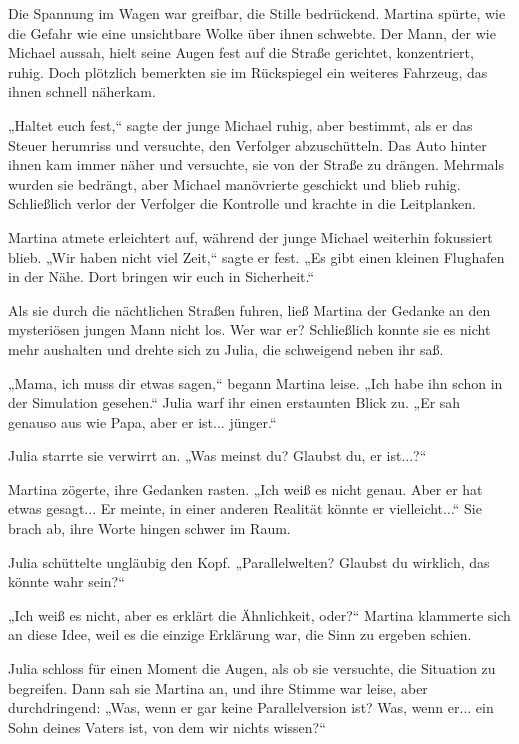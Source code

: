 \documentclass[
]{article}
\begin{document}
Die Spannung im Wagen war greifbar, die Stille bedrückend. Martina
spürte, wie die Gefahr wie eine unsichtbare Wolke über ihnen schwebte.
Der Mann, der wie Michael aussah, hielt seine Augen fest auf die Straße
gerichtet, konzentriert, ruhig. Doch plötzlich bemerkten sie im
Rückspiegel ein weiteres Fahrzeug, das ihnen schnell näherkam.

„Haltet euch fest,`` sagte der junge Michael ruhig, aber bestimmt, als
er das Steuer herumriss und versuchte, den Verfolger abzuschütteln. Das
Auto hinter ihnen kam immer näher und versuchte, sie von der Straße zu
drängen. Mehrmals wurden sie bedrängt, aber Michael manövrierte
geschickt und blieb ruhig. Schließlich verlor der Verfolger die
Kontrolle und krachte in die Leitplanken.

Martina atmete erleichtert auf, während der junge Michael weiterhin
fokussiert blieb. „Wir haben nicht viel Zeit,`` sagte er fest. „Es gibt
einen kleinen Flughafen in der Nähe. Dort bringen wir euch in
Sicherheit.``

Als sie durch die nächtlichen Straßen fuhren, ließ Martina der Gedanke
an den mysteriösen jungen Mann nicht los. Wer war er? Schließlich konnte
sie es nicht mehr aushalten und drehte sich zu Julia, die schweigend
neben ihr saß.

„Mama, ich muss dir etwas sagen,`` begann Martina leise. „Ich habe ihn
schon in der Simulation gesehen.`` Julia warf ihr einen erstaunten Blick
zu. „Er sah genauso aus wie Papa, aber er ist... jünger.``

Julia starrte sie verwirrt an. „Was meinst du? Glaubst du, er
ist...?{\kern0pt}``

Martina zögerte, ihre Gedanken rasten. „Ich weiß es nicht genau. Aber er
hat etwas gesagt... Er meinte, in einer anderen Realität könnte er
vielleicht...`` Sie brach ab, ihre Worte hingen schwer im Raum.

Julia schüttelte ungläubig den Kopf. „Parallelwelten? Glaubst du
wirklich, das könnte wahr sein?{\kern0pt}``

„Ich weiß es nicht, aber es erklärt die Ähnlichkeit, oder?{\kern0pt}``
Martina klammerte sich an diese Idee, weil es die einzige Erklärung war,
die Sinn zu ergeben schien.

Julia schloss für einen Moment die Augen, als ob sie versuchte, die
Situation zu begreifen. Dann sah sie Martina an, und ihre Stimme war
leise, aber durchdringend: „Was, wenn er gar keine Parallelversion ist?
Was, wenn er... ein Sohn deines Vaters ist, von dem wir nichts
wissen?{\kern0pt}``
\end{document}

